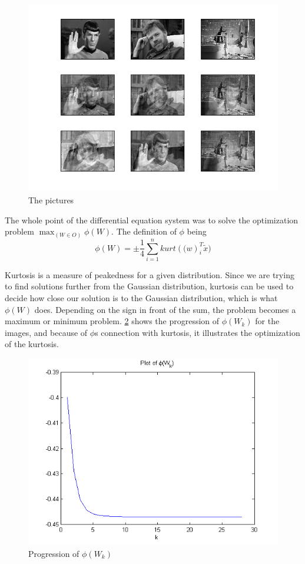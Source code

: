 \begin{figure}[!htbp]
\includegraphics[scale=1]{pappa.png}
\caption{The pictures}
\label{pappa}
\end{figure}


The whole point of the differential equation system was to solve the optimization problem $\max_{(W \in O)} \phi(W)$. The definition of $\phi$ being
\begin{equation}
\phi(W)=\pm \frac{1}{4}\sum^{n}_{i=1}kurt(\mathbf(w)_{i}^{T}\tilde{x})
\end{equation}

Kurtosis is a measure of peakedness for a given distribution. Since we are trying to find solutions further from the Gaussian distribution, kurtosis can be used to decide how close our solution is to the Gaussian distribution, which is what $\phi(W)$ does. Depending on the sign in front of the sum, the problem becomes a maximum or minimum problem. \cref{phiW} shows the progression of $\phi(W_k)$ for the images, and because of $\phi$s connection with kurtosis, it illustrates the optimization of the kurtosis.


\begin{figure}
\includegraphics[scale=0.8]{phiW.png}
\caption{Progression of $\phi(W_k)$ }
\label{phiW}
\end{figure}



